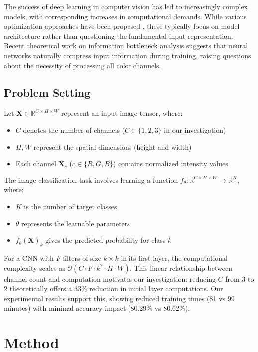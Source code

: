 \documentclass{article} %
\begin{document}
The success of deep learning in computer vision has led to increasingly complex models, with corresponding increases in computational demands. While various optimization approaches have been proposed \citep{Han2015DeepCC,Howard2017MobileNetsEC}, these typically focus on model architecture rather than questioning the fundamental input representation. Recent theoretical work on information bottleneck analysis \citep{Shwartz-Ziv2017OpeningTB} suggests that neural networks naturally compress input information during training, raising questions about the necessity of processing all color channels.

\subsection{Problem Setting}
Let $\mathbf{X} \in \mathbb{R}^{C \times H \times W}$ represent an input image tensor, where:
\begin{itemize}
    \item $C$ denotes the number of channels ($C \in \{1,2,3\}$ in our investigation)
    \item $H, W$ represent the spatial dimensions (height and width)
    \item Each channel $\mathbf{X}_c$ ($c \in \{R,G,B\}$) contains normalized intensity values
\end{itemize}

The image classification task involves learning a function $f_\theta: \mathbb{R}^{C \times H \times W} \rightarrow \mathbb{R}^K$, where:
\begin{itemize}
    \item $K$ is the number of target classes
    \item $\theta$ represents the learnable parameters
    \item $f_\theta(\mathbf{X})_k$ gives the predicted probability for class $k$
\end{itemize}

For a CNN with $F$ filters of size $k \times k$ in its first layer, the computational complexity scales as $\mathcal{O}(C \cdot F \cdot k^2 \cdot H \cdot W)$. This linear relationship between channel count and computation motivates our investigation: reducing $C$ from 3 to 2 theoretically offers a 33\% reduction in initial layer computations. Our experimental results support this, showing reduced training times (81 vs 99 minutes) with minimal accuracy impact (80.29\% vs 80.62\%).

\section{Method}
\label{sec:method}
\end{document}
